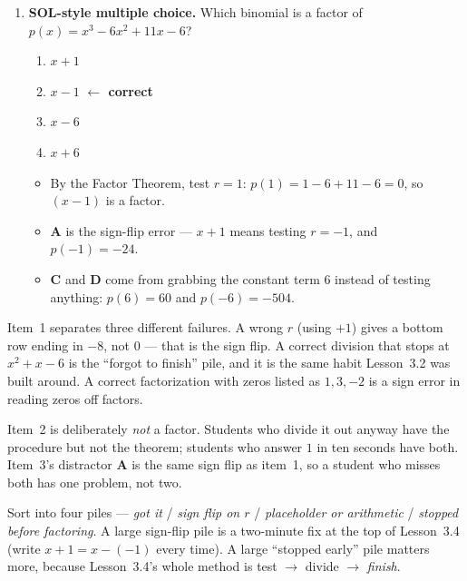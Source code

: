 \documentclass[10pt]{article}
\begin{document}
\begin{enumerate}[leftmargin=1.8em, itemsep=12pt]
  \item \textbf{SOL-style multiple choice.} Which binomial is a factor of
    $p(x) = x^3 - 6x^2 + 11x - 6$?
    \begin{enumerate}[label=\Alph*., leftmargin=1.9em, itemsep=1pt]
      \item $x + 1$
      \item $x - 1$ \quad \textcolor{keyred}{\textbf{$\leftarrow$ correct}}
      \item $x - 6$
      \item $x + 6$
    \end{enumerate}
    \begin{itemize}[leftmargin=1.5em, nosep]
      \item By the Factor Theorem, test $r=1$: $p(1) = 1-6+11-6 = 0$, so $(x-1)$ is a factor.
      \item \textbf{A} is the sign-flip error --- $x+1$ means testing $r=-1$, and $p(-1) = -24$.
      \item \textbf{C} and \textbf{D} come from grabbing the constant term $6$ instead of testing anything: $p(6) = 60$ and $p(-6) = -504$.
    \end{itemize}
\end{enumerate}

\begin{teachernote}
Item~1 separates three different failures. A wrong $r$ (using $+1$) gives a bottom row ending in
$-8$, not $0$ --- that is the sign flip. A correct division that stops at $x^2+x-6$ is the
``forgot to finish'' pile, and it is the same habit Lesson~3.2 was built around. A correct
factorization with zeros listed as $1, 3, -2$ is a sign error in reading zeros off factors.

\vspace{3pt}
Item~2 is deliberately \emph{not} a factor. Students who divide it out anyway have the procedure but
not the theorem; students who answer $1$ in ten seconds have both. Item~3's distractor \textbf{A} is
the same sign flip as item~1, so a student who misses both has one problem, not two.

\vspace{3pt}
Sort into four piles --- \emph{got it} / \emph{sign flip on $r$} / \emph{placeholder or arithmetic}
/ \emph{stopped before factoring}. A large sign-flip pile is a two-minute fix at the top of
Lesson~3.4 (write $x+1 = x-(-1)$ every time). A large ``stopped early'' pile matters more, because
Lesson~3.4's whole method is test $\rightarrow$ divide $\rightarrow$ \emph{finish}.
\end{teachernote}
\end{document}
